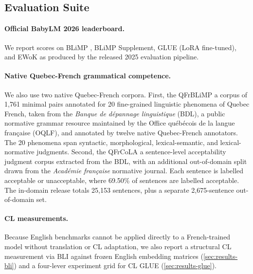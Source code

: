 \documentclass[11pt]{article}
\begin{document}
\subsection{Evaluation Suite}
\label{sec:eval-suite}

\paragraph{Official BabyLM 2026 leaderboard.} We report scores on BLiMP \citep{warstadt2020blimp}, BLiMP Supplement, GLUE \citep{wang2018glue} (LoRA fine-tuned), and EWoK \citep{ivanova2025ewok} as produced by the released 2025 evaluation pipeline.

\paragraph{Native Quebec-French grammatical competence.}
We also use two native Quebec-French corpora. First, the QFrBLiMP \citep{beauchemin2025qfrblimp} a corpus of 1{,}761 minimal pairs annotated for 20 fine-grained linguistic phenomena of Quebec French, taken from the \emph{Banque de dépannage linguistique} (BDL), a public normative grammar resource maintained by the Office québécois de la langue fran\c{c}aise (OQLF), and annotated by twelve native Quebec-French annotators. The 20 phenomena span syntactic, morphological, lexical-semantic, and lexical-normative judgments.
Second, the QFrCoLA \citep{beauchemin2025qfrcola} a sentence-level acceptability judgment corpus extracted from the BDL, with an additional out-of-domain split drawn from the \emph{Académie fran\c{c}aise} normative journal. Each sentence is labelled acceptable or unacceptable, where 69.50\% of sentences are labelled acceptable. The in-domain release totals 25{,}153 sentences, plus a separate 2{,}675-sentence out-of-domain set.


\paragraph{CL measurements.} Because English benchmarks cannot be applied directly to a French-trained model without translation or CL adaptation, we also report a structural CL measurement via BLI against frozen English embedding matrices (\autoref{sec:results-bli}) and a four-lever experiment grid for CL GLUE (\autoref{sec:results-glue}).
\end{document}
